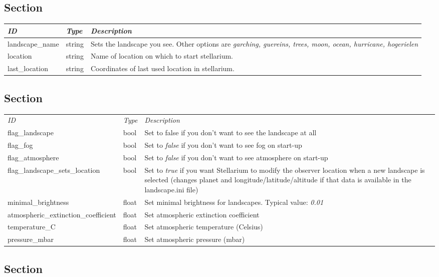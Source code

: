 \subsection{Section
}\label{section-init-location}

\begin{longtabu} to \textwidth {l|l|X}
\toprule
\emph{ID} & \emph{Type} & \emph{Description}\tabularnewline
\midrule
landscape\_name & string & Sets the landscape you see.
Other options are \emph{garching, guereins, trees, moon, ocean,
hurricane, hogerielen}\tabularnewline
\midrule
location & string & Name of location on which to start
stellarium.\tabularnewline
\midrule
last\_location & string & Coordinates of last used location in
stellarium.\tabularnewline
\bottomrule
\end{longtabu}

\subsection{Section }\label{section-landscape}

\begin{longtabu} to \textwidth {l|l|X}
\toprule
\emph{ID} & \emph{Type} & \emph{Description}\tabularnewline
flag\_landscape & bool & Set to false if you don't want to
see the landscape at all\tabularnewline
\midrule
flag\_fog & bool & Set to \emph{false} if you don't want to
see fog on start-up\tabularnewline
\midrule
flag\_atmosphere & bool & Set to \emph{false} if you don't
want to see atmosphere on start-up\tabularnewline
\midrule
flag\_landscape\_sets\_location & bool & Set to \emph{true}
if you want Stellarium to modify the observer location when a new
landscape is selected (changes planet and longitude/latitude/altitude if
that data is available in the landscape.ini file)\tabularnewline
\midrule
minimal\_brightness & float & Set minimal brightness for
landscapes. Typical value: \emph{0.01}\tabularnewline
\midrule
atmospheric\_extinction\_coefficient & float & Set atmospheric
extinction coefficient\tabularnewline
\midrule
temperature\_C & float & Set atmospheric temperature
(Celsius)\tabularnewline
\midrule
pressure\_mbar & float & Set atmospheric pressure
(mbar)\tabularnewline
\bottomrule
\end{longtabu}

\subsection{Section }\label{section-localization}

